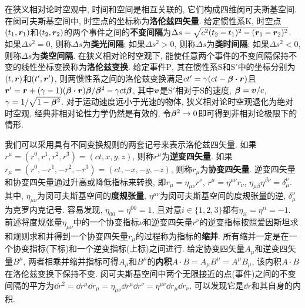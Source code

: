 在狭义相对论时空观中, 时间和空间是相互关联的, 它们构成四维闵可夫斯基空间. 在闵可夫斯基空间中, 时空点的坐标称为\textbf{洛伦兹四矢量}. 给定惯性系$ \mathrm{K} $, 时空点$ (t_1,\vb*{r}_1) $和$ (t_2,\vb*{r}_2) $的两个事件之间的\textbf{不变间隔}为$ \Delta s = \sqrt{c^2(t_2-t_1)^2-(\vb*{r}_1-\vb*{r}_2)^2} $. 如果$ \Delta s^2 = 0 $, 则称$ \Delta s $为\textbf{类光间隔}; 如果$ \Delta s^2 > 0 $, 则称$ \Delta s $为\textbf{类时间隔}; 如果$ \Delta s^2 < 0 $, 则称$ \Delta s $为\textbf{类空间隔}. 在狭义相对论时空观下, 能使任意两个事件的不变间隔保持不变的线性坐标变换称为\textbf{洛伦兹变换}. 给定事件$ \mathrm{P} $, 其在惯性系$ \mathrm{S} $和$ \mathrm{S}' $中的坐标分别为$ (t,\vb*{r}) $和$ (t',\vb*{r}') $, 则两惯性系之间的洛伦兹变换满足$ ct' = \gamma(ct - \vb*{\beta} \vdot \vb*{r}) $且$ \vb*{r}' = \vb*{r} + (\gamma-1) (\vb*{\beta} \vdot \vb*{r}) \vb*{\beta} / \vb*{\beta}^2 - \gamma ct \vb*{\beta} $, 其中$ \vb*{v} $是$ \mathrm{S}' $相对于$ \mathrm{S} $的速度, $ \vb*{\beta}=\vb*{v}/c $, $ \gamma=1/\sqrt{1-\vb*{\beta}^2} $. 对于运动速度远小于光速的物体, 狭义相对论时空观退化为绝对时空观, 经典非相对论性力学仍然是有效的, 令$ \vb*{\beta}^2 \to 0 $即可得到非相对论极限下的情形.

我们可以采用具有不同变换规则的两套记号来表示洛伦兹四矢量. 如果$ r^{\mu}=(r^0,r^1,r^2,r^3)=(ct,x,y,z) $, 则称$ r^{\mu} $为\textbf{逆变四矢量}. 如果$ r_{\mu}=(r^0,-r^1,-r^2,-r^3)=(ct,-x,-y,-z) $, 则称$ r_{\mu} $为\textbf{协变四矢量}. 逆变四矢量和协变四矢量通过升高或降低指标来转换, 即$ r_{\mu}=\eta_{\mu\nu} r^{\nu} $, $ r^{\mu}=\eta^{\mu\nu} r_{\nu} $, $ \eta_{\mu\beta}\eta^{\beta\nu}=\delta_{\mu}^{\nu} $. 其中, $ \eta_{\mu\nu} $为闵可夫斯基空间的\textbf{度规张量}, $ \eta^{\mu\nu} $为闵可夫斯基空间的度规张量的逆, $ \delta_{\mu}^{\nu} $为克罗内克记号. 容易发现, $ \eta_{00}=\eta^{00}=1 $, 且对意$ i \in \{1,2,3\} $都有$ \eta_{ii}=\eta^{ii}=-1 $. 前述将度规张量$ \eta_{\mu\nu} $中的一个协变指标$ \nu $和逆变四矢量$ r^{\nu} $的逆变指标按照爱因斯坦求和规则求和并得到一个协变四矢量$ r_{\mu} $的过程称为指标的\textbf{缩并}. 所有缩并一定是在一个协变指标(下标)和一个逆变指标(上标)之间进行. 给定协变四矢量$ A_{\mu} $和逆变四矢量$ B^{\mu} $, 两者相乘并缩并指标可得$ A_{\mu} $和$ B^{\mu} $的\textbf{内积}$ A \cdot B = A_{\mu}B^{\mu} = A^{\mu}B_{\mu} $, 该内积$ A \cdot B $在洛伦兹变换下保持不变. 闵可夫斯基空间中两个无限接近的点(事件)之间的不变间隔的平方为$ \dd r^2 = \dd{r^{\mu}} \dd{r_{\mu}} = \eta_{\mu\nu} \dd{r^{\mu}} \dd{r^{\nu}} = \eta^{\mu\nu} \dd{r_{\mu}} \dd{r_{\nu}} $, 可以发现它是$ \dd{r} $和其自身的内积.


